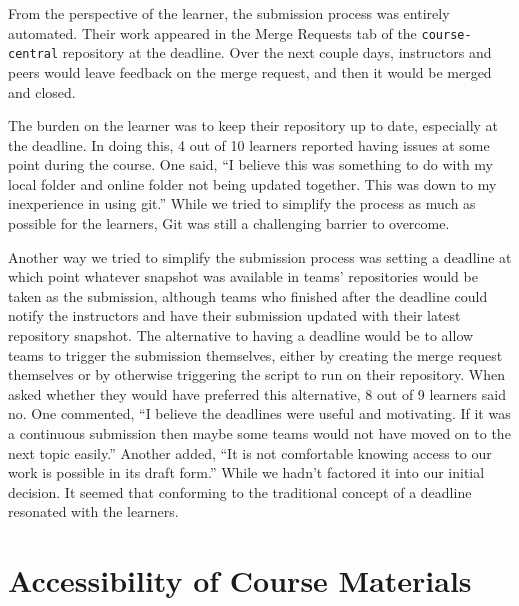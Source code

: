 \documentclass[12pt,twoside]{mitthesis}
\newcommand{\review}[1]{{#1}}
\begin{document}
\review{From the perspective of the learner, the submission process was entirely automated. Their work appeared in the Merge Requests tab of the \texttt{course-central} repository at the deadline. Over the next couple days, instructors and peers would leave feedback on the merge request, and then it would be merged and closed.

The burden on the learner was to keep their repository up to date, especially at the deadline. In doing this, 4 out of 10 learners reported having issues at some point during the course. One said, ``I believe this was something to do with my local folder and online folder not being updated together. This was down to my inexperience in using git.'' While we tried to simplify the process as much as possible for the learners, Git was still a challenging barrier to overcome.

Another way we tried to simplify the submission process was setting a deadline at which point whatever snapshot was available in teams' repositories would be taken as the submission, although teams who finished after the deadline could notify the instructors and have their submission updated with their latest repository snapshot. The alternative to having a deadline would be to allow teams to trigger the submission themselves, either by creating the merge request themselves or by otherwise triggering the script to run on their repository. When asked whether they would have preferred this alternative, 8 out of 9 learners said no. One commented, ``I believe the deadlines were useful and motivating. If it was a continuous submission then maybe some teams would not have moved on to the next topic easily.'' Another added, ``It is not comfortable knowing access to our work is possible in its draft form.'' While we hadn't factored it into our initial decision. It seemed that conforming to the traditional concept of a deadline resonated with the learners.}

\section{Accessibility of Course Materials}
\end{document}
